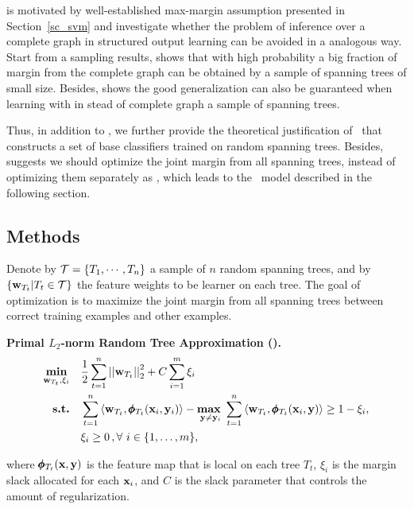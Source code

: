 { is motivated by well-established max-margin assumption presented in Section~\ref{sc_svm} and investigate whether the problem of inference over a complete graph in structured output learning can be avoided in a analogous way.
Start from a sampling results,  shows that with high probability a big fraction of margin from the complete graph can be obtained by a sample of spanning trees of small size.
Besides,  shows the good generalization can also be guaranteed when learning with in stead of complete graph a sample of spanning trees.

Thus, in addition to , we further provide the theoretical justification of \mam\ that constructs a set of base classifiers trained on random spanning trees. 
Besides,  suggests we should optimize the joint margin from all spanning trees, instead of optimizing them separately as \mam, which leads to the \rta\ model described in the following section.

\subsection{Methods}

Denote by $\mathcal{T}=\{T_1,\cdots,T_n\}$ a sample of $n$ random spanning trees, and by $\{\mathbf {w}_{T_t}|T_t\in\mathcal{T}\}$ the feature weights to be learner on each tree.
The goal of optimization is to maximize the joint margin from all spanning trees between correct training examples and other examples.
\begin{definition}{\bf Primal $L_2$-norm Random Tree Approximation (\rta).}\label{primalrta}
	\begin{align*}
		\underset{\vw_{T_t},\xi_i}{\minimize} & \quad \frac{1}{2}\sum_{t=1}^{n}\norm{\vw_{T_t}}_2^2 + C\sum_{i=1}^{m}\xi_i\\
		\st & \quad \sum_{t=1}^{n}{ \langle \vw_{T_t}, \phib_{T_t}(\vx_i,\vy_i) \rangle} - \underset{\vy \neq \vy_i}{\maximize\ } \sum_{t=1}^{n}{\langle \vw_{T_t}, \phib_{T_t}(\vx_i,\vy) \rangle } \geq 1 -  \xi_i, \\
		& \quad \xi_i\ge0\, , \forall\ i \in \set{1,\dots,m},
	\end{align*}
\end{definition}
where $\pmb \phi_{T_t}(\mathbf {x},\mathbf {y})$ is the feature map that is local on each tree $T_t$, $\xi_i$ is the margin slack allocated for each $\mathbf {x}_i$, and $C$ is the slack parameter that controls the amount of regularization.

}
